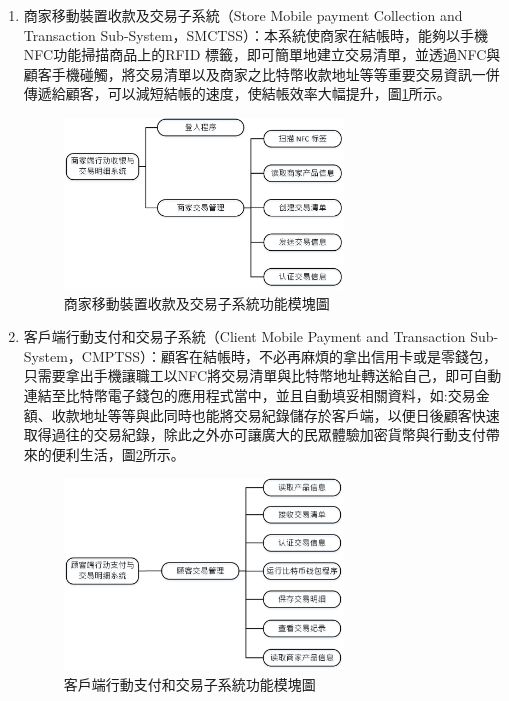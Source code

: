 \begin{enumerate}
		\item 商家移動裝置收款及交易子系統（Store Mobile payment Collection and Transaction Sub-System，SMCTSS）：本系統使商家在結帳時，能夠以手機NFC功能掃描商品上的RFID 標籤，即可簡單地建立交易清單，並透過NFC與顧客手機碰觸，將交易清單以及商家之比特幣收款地址等等重要交易資訊一併傳遞給顧客，可以減短結帳的速度，使結帳效率大幅提升，圖\ref{model3}所示。
		 
			\begin{figure}[!htbp]
			\centering
			\includegraphics[width = 0.7\textwidth]{model3.jpg}
			\caption{商家移動裝置收款及交易子系統功能模塊圖}\label{model3}
			\end{figure}


		\item 客戶端行動支付和交易子系統（Client Mobile Payment and Transaction Sub-System，CMPTSS）：顧客在結帳時，不必再麻煩的拿出信用卡或是零錢包，只需要拿出手機讓職工以NFC將交易清單與比特幣地址轉送給自己，即可自動連結至比特幣電子錢包的應用程式當中，並且自動填妥相關資料，如:交易金額、收款地址等等與此同時也能將交易紀錄儲存於客戶端，以便日後顧客快速取得過往的交易紀錄，除此之外亦可讓廣大的民眾體驗加密貨幣與行動支付帶來的便利生活，圖\ref{model2}所示。
			\begin{figure}[!htbp]
			\centering
			\includegraphics[width = 0.7\textwidth]{model2.jpg}
			\caption{客戶端行動支付和交易子系統功能模塊圖}\label{model2}
			\end{figure}
		
	\end{enumerate}
	

